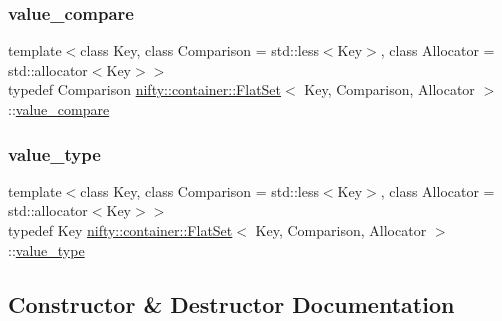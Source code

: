 \mbox{\label{classnifty_1_1container_1_1FlatSet_a4ec0fabbb2d2f25b985c12581c576384}} 
\subsubsection{\texorpdfstring{value\+\_\+compare}{value\_compare}}
{\footnotesize\ttfamily template$<$class Key, class Comparison = std\+::less$<$\+Key$>$, class Allocator = std\+::allocator$<$\+Key$>$$>$ \\
typedef Comparison \hyperlink{classnifty_1_1container_1_1FlatSet}{nifty\+::container\+::\+Flat\+Set}$<$ Key, Comparison, Allocator $>$\+::\hyperlink{classnifty_1_1container_1_1FlatSet_a4ec0fabbb2d2f25b985c12581c576384}{value\+\_\+compare}}

\mbox{\label{classnifty_1_1container_1_1FlatSet_a2366c665ec49d585ff8a77362468d82d}} 
\subsubsection{\texorpdfstring{value\+\_\+type}{value\_type}}
{\footnotesize\ttfamily template$<$class Key, class Comparison = std\+::less$<$\+Key$>$, class Allocator = std\+::allocator$<$\+Key$>$$>$ \\
typedef Key \hyperlink{classnifty_1_1container_1_1FlatSet}{nifty\+::container\+::\+Flat\+Set}$<$ Key, Comparison, Allocator $>$\+::\hyperlink{classnifty_1_1container_1_1FlatSet_a2366c665ec49d585ff8a77362468d82d}{value\+\_\+type}}



\subsection{Constructor \& Destructor Documentation}
\mbox{\label{classnifty_1_1container_1_1FlatSet_a8fdc9c4a6bf11be6e7be0d81d450ae47}} 

